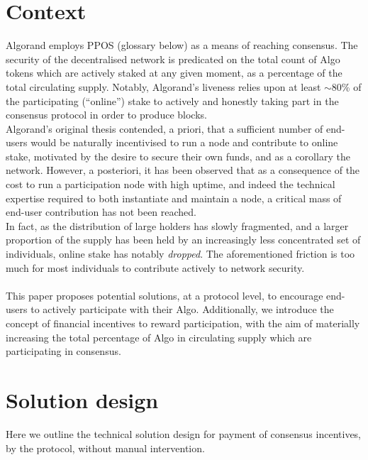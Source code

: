 \documentclass[11pt,a4paper]{article}
\begin{document}
\pagebreak

\section{Context}
Algorand employs \gls{PPOS} (glossary below) as a means of reaching consensus. The security of the decentralised network 
is predicated on the total count of Algo tokens which are actively staked at any given moment, as a percentage of the 
total circulating supply. Notably, Algorand's liveness relies upon at least $\sim$80\% of the
participating (``online'') stake to actively and honestly taking part in the consensus protocol in order to produce 
blocks. \\ 

Algorand's original thesis contended, a priori, that a sufficient number of end-users would be naturally incentivised to 
run a node and contribute to online stake, motivated by the desire to secure their own funds, and as a corollary the 
network. However, a posteriori, it has been observed that as a consequence of the cost to run a participation node with 
high uptime, and indeed the technical expertise required to both instantiate and maintain a node, a critical mass of 
end-user contribution has not been reached. \\

In fact, as the distribution of large holders has slowly fragmented, and a larger proportion of the supply has been held 
by an increasingly less concentrated set of individuals, online stake has notably \emph{dropped}. The aforementioned 
friction is too much for most individuals to contribute actively to network security. \\ \\

This paper proposes potential solutions, at a protocol level, to encourage end-users to actively participate with their 
Algo. Additionally, we introduce the concept of financial incentives to reward participation, with the aim of materially 
increasing the total percentage of Algo in circulating supply which are participating in consensus. 

\pagebreak

\section{Solution design}
Here we outline the technical solution design for payment of consensus incentives, by the protocol, without manual 
intervention. 
\end{document}
